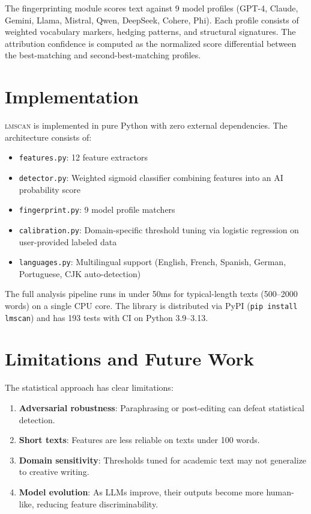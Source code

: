 \documentclass[11pt]{article}
\begin{document}
The fingerprinting module scores text against 9 model profiles (GPT-4, Claude, Gemini, Llama, Mistral, Qwen, DeepSeek, Cohere, Phi). Each profile consists of weighted vocabulary markers, hedging patterns, and structural signatures. The attribution confidence is computed as the normalized score differential between the best-matching and second-best-matching profiles.

\section{Implementation}

\textsc{lmscan} is implemented in pure Python with zero external dependencies. The architecture consists of:

\begin{itemize}
    \item \texttt{features.py}: 12 feature extractors
    \item \texttt{detector.py}: Weighted sigmoid classifier combining features into an AI probability score
    \item \texttt{fingerprint.py}: 9 model profile matchers
    \item \texttt{calibration.py}: Domain-specific threshold tuning via logistic regression on user-provided labeled data
    \item \texttt{languages.py}: Multilingual support (English, French, Spanish, German, Portuguese, CJK auto-detection)
\end{itemize}

The full analysis pipeline runs in under 50ms for typical-length texts (500--2000 words) on a single CPU core. The library is distributed via PyPI (\texttt{pip install lmscan}) and has 193 tests with CI on Python 3.9--3.13.

\section{Limitations and Future Work}

The statistical approach has clear limitations:

\begin{enumerate}
    \item \textbf{Adversarial robustness}: Paraphrasing or post-editing can defeat statistical detection.
    \item \textbf{Short texts}: Features are less reliable on texts under 100 words.
    \item \textbf{Domain sensitivity}: Thresholds tuned for academic text may not generalize to creative writing.
    \item \textbf{Model evolution}: As LLMs improve, their outputs become more human-like, reducing feature discriminability.
\end{enumerate}
\end{document}
